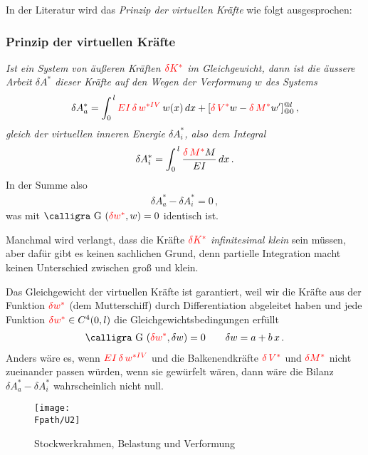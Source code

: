 {{{{In der Literatur wird das {\em Prinzip der virtuellen Kr\"{a}fte\/} wie folgt ausgesprochen: \\

{\textcolor{sectionTitleBlue}{\subsubsection*{Prinzip der virtuellen Kr\"{a}fte}}}
{\em Ist ein System von \"{a}u{\ss}eren Kr\"{a}ften $\textcolor{red}{\delta K^*}$ im Gleichgewicht, dann ist die \"{a}ussere Arbeit $\delta A^*$ dieser Kr\"{a}fte auf den Wegen der Verformung $w$ des Systems
\begin{align}
\delta A_a^* = \int_0^{\,l} \textcolor{red}{EI\,\delta \,w^{*IV}}\,w(x)\,dx + [\textcolor{red}{\delta \,V^*}  w - \textcolor{red}{\delta \,M^*} w']_{@0}^{@l}\,,
\end{align}
gleich der virtuellen inneren Energie $\delta A_i^*$, also dem Integral\/}
\begin{align}
\delta A_i^* = \int_0^{\,l} \frac{\textcolor{red}{\delta \,M^*} M}{EI}\,dx\,.
\end{align}
In der Summe also
\begin{align}
\delta A_a^* - \delta A_i^* = 0\,,
\end{align}
was mit $\text{\normalfont\calligra G\,\,}(\textcolor{red}{\delta w^*},w) = 0$ identisch ist.

Manchmal wird verlangt, dass die  Kr\"{a}fte $\textcolor{red}{\delta K^*}$ {\em infinitesimal klein\/} sein m\"{u}ssen, aber daf\"{u}r gibt es keinen sachlichen Grund, denn partielle Integration macht keinen Unterschied zwischen gro{\ss} und klein.

Das Gleichgewicht der virtuellen Kr\"{a}fte ist garantiert, weil wir die Kr\"{a}fte aus der Funktion $\textcolor{red}{\delta w^*}$ (dem \glq Mutterschiff\grq{}) durch Differentiation abgeleitet haben und jede Funktion $\textcolor{red}{\delta w^*} \in C^4(0,l)$ die Gleich\-gewichtsbedingungen erf\"{u}llt
\begin{align}\label{Eq4}
\text{\normalfont\calligra G\,\,}(\textcolor{red}{\delta w^*},\delta w) =  0  \qquad \delta w = a + b\,x\,.
\end{align}
Anders w\"{a}re es, wenn $\textcolor{red}{EI\,\delta \,w^{*IV}}$ und die Balkenendkr\"{a}fte $\textcolor{red}{\delta\,V^*}$ und $\textcolor{red}{\delta M^*}$ nicht zueinander passen w\"{u}rden, wenn sie \glq gew\"{u}rfelt\grq{} w\"{a}ren, dann w\"{a}re die Bilanz $\delta A_a^* - \delta A_i^*$ wahrscheinlich nicht  null.
\begin{figure}[tbp]
\centering
\if {} \sidecaption \fi
\texttt{[image: \\Fpath/U2]}
\caption{Stockwerkrahmen, Belastung und Verformung} \label{U2}
\end{figure}%

}}}}
